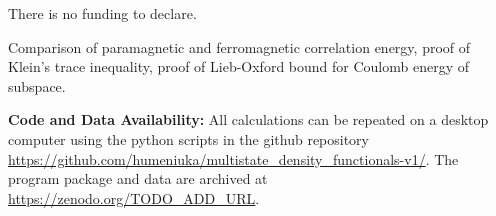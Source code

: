 \documentclass[journal=jpclcd,manuscript=letter]{achemso}
\begin{document}
\begin{acknowledgement}
There is no funding to declare.
\end{acknowledgement}


\begin{suppinfo}
Comparison of paramagnetic and ferromagnetic correlation energy,
proof of Klein's trace inequality,
proof of Lieb-Oxford bound for Coulomb energy of subspace.

\textbf{Code and Data Availability:}
All calculations can be repeated on a desktop computer using the python scripts
in the github repository
\url{https://github.com/humeniuka/multistate_density_functionals-v1/}.
The program package and data are archived at \url{https://zenodo.org/TODO_ADD_URL}.

\end{suppinfo}


\end{document}
